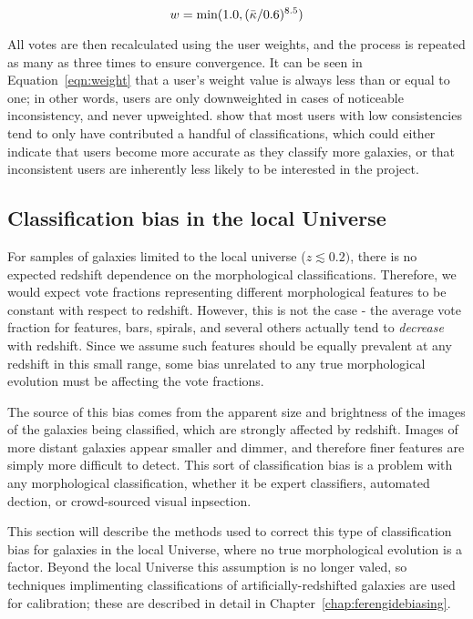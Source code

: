 \begin{equation}
w = \rm min (1.0,(\bar{\kappa}/0.6)^{8.5})
\label{eqn:weight}
\end{equation}

All votes are then recalculated using the user weights, and the process is repeated as many as three times to ensure convergence. It can be seen in Equation~\ref{eqn:weight} that a user's weight value is always less than or equal to one; in other words, users are only downweighted in cases of noticeable inconsistency, and never upweighted. \citet{Willett2013} show that most users with low consistencies tend to only have contributed a handful of classifications, which could either indicate that users become more accurate as they classify more galaxies, or that inconsistent users are inherently less likely to be interested in the project. 

 
\subsection{Classification bias in the local Universe}

For samples of galaxies limited to the local universe ($z\lesssim0.2)$, there is no expected redshift dependence on the morphological classifications. Therefore, we would expect vote fractions representing different morphological features to be constant with respect to redshift. However, this is not the case - the average vote fraction for features, bars, spirals, and several others actually tend to \emph{decrease} with redshift. Since we assume such features should be equally prevalent at any redshift in this small range, some bias unrelated to any true morphological evolution must be affecting the vote fractions. 

The source of this bias comes from the apparent size and brightness of the images of the galaxies being classified, which are strongly affected by redshift. Images of more distant galaxies appear smaller and dimmer, and therefore finer features are simply more difficult to detect. This sort of classification bias is a problem with any morphological classification, whether it be expert classifiers, automated dection, or crowd-sourced visual inpsection.

This section will describe the methods used to correct this type of classification bias for galaxies in the local Universe, where no true morphological evolution is a factor. Beyond the local Universe this assumption is no longer valed, so techniques implimenting classifications of artificially-redshifted galaxies are used for calibration; these are described in detail in Chapter~\ref{chap:ferengidebiasing}. 


